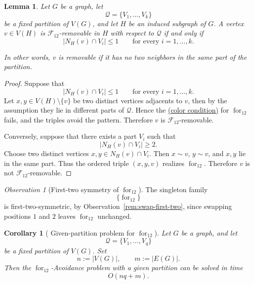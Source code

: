 \documentclass[12pt]{article}
\theoremstyle{plain}
\newtheorem{lemma}[theorem]{Lemma}
\newtheorem{corollary}[theorem]{Corollary}
\theoremstyle{definition}
\theoremstyle{remark}
\newtheorem{observation}[theorem]{Observation}
\theoremstyle{definition}
\newcommand{\colorcondition}{%
  \hyperref[def:avoid:cond:color]{(color condition)}\xspace
}
\newcommand{\forlabel}{\mathrm{for}}
\DeclareRobustCommand{\forparam}[1]{%
  \ensuremath{\mathop{\forlabel}\nolimits_{#1}}%
}
\begin{document}
\begin{lemma}\label{lem:removable-for12}
Let \(G\) be a graph, let
\[
\mathcal Q=\{V_1,\dots,V_k\}
\]
be a fixed partition of \(V(G)\), and let \(H\) be an induced subgraph of \(G\).
A vertex \(v\in V(H)\) is \(\mathcal F_{12}\)-removable in \(H\) with respect to \(\mathcal Q\) if and only if
\[
|N_H(v)\cap V_i|\le 1
\qquad\text{for every } i=1,\dots,k.
\]

In other words, \(v\) is removable if it has no two neighbors in the same part of the partition.

\end{lemma}

\begin{proof}

Suppose that
\[
|N_H(v)\cap V_i|\le 1
\qquad\text{for every } i=1,\dots,k.
\]
Let \(x,y\in V(H)\setminus\{v\}\) be two distinct vertices adjacents to \(v\), then by the assumption they lie in different
parts of \(\mathcal Q\). Hence the \colorcondition for \(\operatorname{for}_{12}\) fails, and the triples avoid the
pattern. Therefore \(v\) is \(\mathcal F_{12}\)-removable.

Conversely, suppose that there exists a part \(V_i\) such that
\[
|N_H(v)\cap V_i|\ge 2.
\]
Choose two distinct vertices \(x,y\in N_H(v)\cap V_i\). Then \(x\sim v\), \(y\sim v\), and \(x,y\) lie in the same
part. Thus the ordered triple \((x,y,v)\) realizes \(\operatorname{for}_{12}\). Therefore \(v\) is not
\(\mathcal F_{12}\)-removable.

\end{proof}



\begin{observation}[First-two symmetry of \(\forparam{12}\)]
\label{obs:for12-first-two-symmetric}
The singleton family
\[
\{\forparam{12}\}
\]
is first-two-symmetric, by Observation~\ref{rem:swap-first-two}, since swapping positions \(1\) and \(2\) leaves
\(\forparam{12}\) unchanged.
\end{observation}


\begin{corollary}[
Given-partition problem for
\texorpdfstring{\(\forparam{12}\)}{for12}
]
\label{cor:for12-given-partition-polynomial}
Let \(G\) be a graph, and let
\[
\mathcal Q=\{V_1,\dots,V_q\}
\]
be a fixed partition of \(V(G)\). Set
\[
n:=|V(G)|,
\qquad
m:=|E(G)|.
\]
Then the \(\forparam{12}\)-Avoidance problem with a given partition can
be solved in time
\[
O(nq+m).
\]
\end{corollary}
\end{document}
